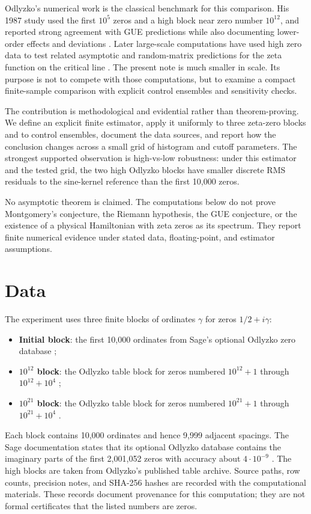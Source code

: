 \documentclass[11pt]{article}
\begin{document}
Odlyzko's numerical work is the classical benchmark for this comparison.  His 1987 study used the first $10^5$ zeros and a high block near zero number $10^{12}$, and reported strong agreement with GUE predictions while also documenting lower-order effects and deviations \cite{odlyzko1987spacings}.  Later large-scale computations have used high zero data to test related asymptotic and random-matrix predictions for the zeta function on the critical line \cite{hiaryOdlyzko2010criticalLine}.  The present note is much smaller in scale.  Its purpose is not to compete with those computations, but to examine a compact finite-sample comparison with explicit control ensembles and sensitivity checks.

The contribution is methodological and evidential rather than theorem-proving.  We define an explicit finite estimator, apply it uniformly to three zeta-zero blocks and to control ensembles, document the data sources, and report how the conclusion changes across a small grid of histogram and cutoff parameters.  The strongest supported observation is high-vs-low robustness: under this estimator and the tested grid, the two high Odlyzko blocks have smaller discrete RMS residuals to the sine-kernel reference than the first 10,000 zeros.

No asymptotic theorem is claimed.  The computations below do not prove Montgomery's conjecture, the Riemann hypothesis, the GUE conjecture, or the existence of a physical Hamiltonian with zeta zeros as its spectrum.  They report finite numerical evidence under stated data, floating-point, and estimator assumptions.

\section{Data}

The experiment uses three finite blocks of ordinates $\gamma$ for zeros $1/2+i\gamma$:
\begin{itemize}
  \item \textbf{Initial block}: the first 10,000 ordinates from Sage's optional Odlyzko zero database \cite{sageOdlyzkoDatabase};
  \item \textbf{$10^{12}$ block}: the Odlyzko table block for zeros numbered $10^{12}+1$ through $10^{12}+10^4$ \cite{odlyzkoZetaTables};
  \item \textbf{$10^{21}$ block}: the Odlyzko table block for zeros numbered $10^{21}+1$ through $10^{21}+10^4$ \cite{odlyzkoZetaTables}.
\end{itemize}
Each block contains 10,000 ordinates and hence 9,999 adjacent spacings.  The Sage documentation states that its optional Odlyzko database contains the imaginary parts of the first 2,001,052 zeros with accuracy about $4\cdot 10^{-9}$ \cite{sageOdlyzkoDatabase}.  The high blocks are taken from Odlyzko's published table archive.  Source paths, row counts, precision notes, and SHA-256 hashes are recorded with the computational materials.  These records document provenance for this computation; they are not formal certificates that the listed numbers are zeros.
\end{document}
